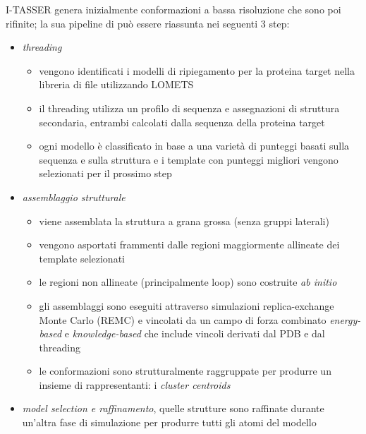 {\par I-TASSER genera inizialmente conformazioni a bassa risoluzione che sono poi rifinite; la sua pipeline di può essere riassunta nei seguenti 3 step\supercite{abbass2020enhancing}:

\begin{itemize}
	\item \textit{threading}
	\begin{itemize}
		\item vengono identificati i modelli di ripiegamento per la proteina target nella libreria di file utilizzando LOMETS
		\item il threading utilizza un profilo di sequenza e assegnazioni di struttura secondaria, entrambi calcolati dalla sequenza della proteina target
		\item ogni modello è classificato in base a una varietà di punteggi basati sulla sequenza e sulla struttura e i template con punteggi migliori vengono selezionati per il prossimo step
	\end{itemize}
	
	\item \textit{assemblaggio strutturale}
	
	\begin{itemize}
		\item viene assemblata la struttura a grana grossa (senza gruppi laterali)
		\item vengono asportati frammenti dalle regioni maggiormente allineate dei template selezionati
		\item le regioni non allineate (principalmente loop) sono costruite \textit{ab initio}
		\item gli assemblaggi sono eseguiti attraverso simulazioni replica-exchange Monte Carlo (REMC) e vincolati da un campo di forza combinato \textit{energy-based} e \textit{knowledge-based} che include vincoli derivati dal PDB e dal threading 
		\item le conformazioni sono strutturalmente raggruppate per produrre un insieme di rappresentanti: i \textit{cluster centroids}
	\end{itemize}
	
	\item \textit{model selection e raffinamento}, quelle strutture sono raffinate durante un'altra fase di simulazione per produrre tutti gli atomi del modello
	
\end{itemize}

}
